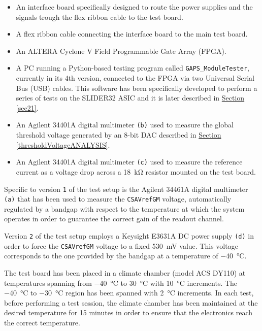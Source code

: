 \begin{itemize}
    \item An interface board specifically designed to route the power supplies and the signals trough the flex ribbon cable to the test board.
    \item A flex ribbon cable connecting the interface board to the main test board.
    \item An ALTERA Cyclone V Field Programmable Gate Array (FPGA).
    \item A PC running a Python-based testing program called \texttt{GAPS\_ModuleTester}, currently in its 4th version, connected to the FPGA via two Universal Serial Bus (USB) cables. This software has been specifically developed to perform a series of tests on the SLIDER32 ASIC and it is later described in \hyperref[sec21]{Section \ref{sec21}}.
    \item An Agilent 34401A digital multimeter \texttt{(b)} used to measure the global threshold voltage generated by an 8-bit DAC described in \hyperref[thresholdVoltageANALYSIS]{Section \ref{thresholdVoltageANALYSIS}}.
    \item An Agilent 34401A digital multimeter \texttt{(c)} used to measure the reference current as a voltage drop across a \SI{18}{\kilo\ohm} resistor mounted on the test board.
\end{itemize}

\par
Specific to version \texttt{1} of the test setup is the Agilent 34461A digital multimeter \texttt{(a)} that has been used to measure the \texttt{CSAVrefGM} voltage, automatically regulated by a bandgap with respect to the temperature at which the system operates in order to guarantee the correct gain of the readout channel.

\par
Version \texttt{2} of the test setup employs a Keysight E3631A DC power supply \texttt{(d)} in order to force the \texttt{CSAVrefGM} voltage to a fixed \SI{530}{\milli\volt} value. This voltage corresponds to the one provided by the bandgap at a temperature of \SI{-40}{\celsius}.

\par
The test board has been placed in a climate chamber (model ACS DY110) at temperatures spanning from \SI{-40}{\celsius} to \SI{30}{\celsius} with \SI{10}{\celsius} increments. The \SI{-40}{\celsius} to \SI{-30}{\celsius} region has been spanned with \SI{2}{\celsius} increments. In each test, before performing a test session, the climate chamber has been maintained at the desired temperature for 15 minutes in order to ensure that the electronics reach the correct temperature.

